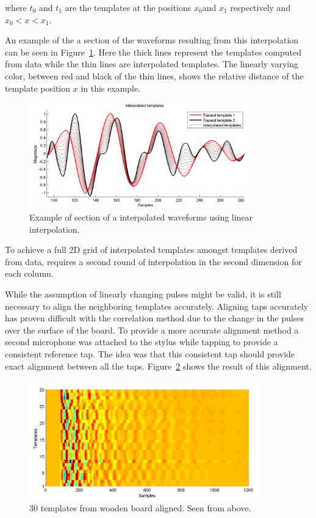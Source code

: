 where $t_0$ and $t_1$ are the templates at the positions $x_0$and $x_1$ respectively and \linebreak[0]$x_0 < x < x_1$.

An example of the a section of the waveforms resulting from this interpolation can be seen in Figure~\ref{fig:InterpData}. Here the thick lines represent the templates computed from data while the thin lines are interpolated templates. The linearly varying color, between red and black of the thin lines, shows the relative distance of the template position $x$ in this example.

\begin{figure}[!]
\centering
\includegraphics[width=360px]{InterpData.pdf}
\caption{Example of section of a interpolated waveforms using linear interpolation.}\label{fig:InterpData}
\end{figure}

To achieve a full 2D grid of interpolated templates amongst templates derived from data, requires a second round of interpolation in the second dimension for each column.

While the assumption of linearly changing pulses might be valid, it is still necessary to align the neighboring templates accurately. Aligning taps accurately has proven difficult with the correlation method due to the change in the pulses over the surface of the board. To provide a more accurate alignment method a second microphone was attached to the stylus while tapping to provide a consistent reference tap. The idea was that this consistent tap should provide exact alignment between all the taps. Figure~\ref{fig:templatesAligned} shows the result of this alignment.

\begin{figure}[!]
\centering
\includegraphics[width=380px]{templatesAligned.pdf}
\caption{30 templates from wooden board aligned. Seen from above.}\label{fig:templatesAligned}
\end{figure}

